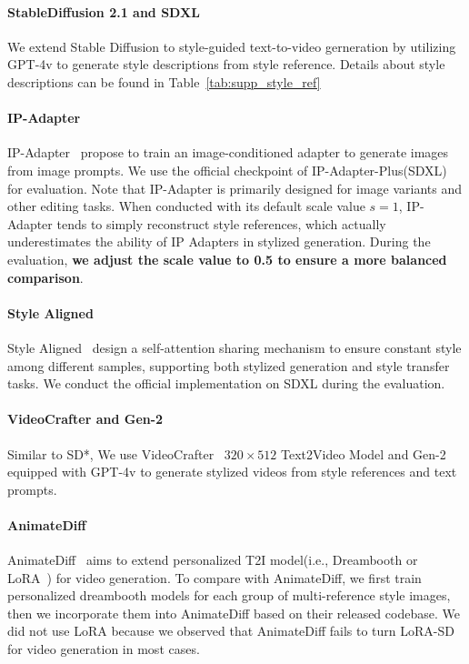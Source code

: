 \paragraph{StableDiffusion 2.1 and SDXL} We extend Stable Diffusion to style-guided text-to-video gerneration by utilizing GPT-4v to generate style descriptions from style reference. Details about style descriptions can be found in Table~\ref{tab:supp_style_ref}

\paragraph{IP-Adapter} IP-Adapter~\cite{ye2023ipadapter} propose to train an image-conditioned adapter to generate images from image prompts. We use the official checkpoint of IP-Adapter-Plus(SDXL) for evaluation. Note that IP-Adapter is primarily designed for image variants and other editing tasks. When conducted with its default scale value $s=1$, IP-Adapter tends to simply reconstruct style references, which actually underestimates the ability of IP Adapters in stylized generation. During the evaluation, \textbf{we adjust the scale value to 0.5 to ensure a more balanced comparison}.

\paragraph{Style Aligned} Style Aligned~\cite{hertz2023style} design a self-attention sharing mechanism to ensure constant style among different samples, supporting both stylized generation and style transfer tasks. We conduct the official implementation on SDXL during the evaluation.

\paragraph{VideoCrafter and Gen-2} Similar to SD*, We use VideoCrafter~\cite{chen2023videocrafter} $320\times512$ Text2Video Model and Gen-2~\cite{Gen-2} equipped with GPT-4v to generate stylized videos from style references and text prompts.

\paragraph{AnimateDiff} AnimateDiff~\cite{guo2023animatediff} aims to extend personalized T2I model(i.e., Dreambooth or LoRA~\cite{hu2022lora}) for video generation. To compare with AnimateDiff, we first train personalized dreambooth models for each group of multi-reference style images, then we incorporate them into AnimateDiff based on their released codebase. We did not use LoRA because we observed that AnimateDiff fails to turn LoRA-SD for video generation in most cases.


